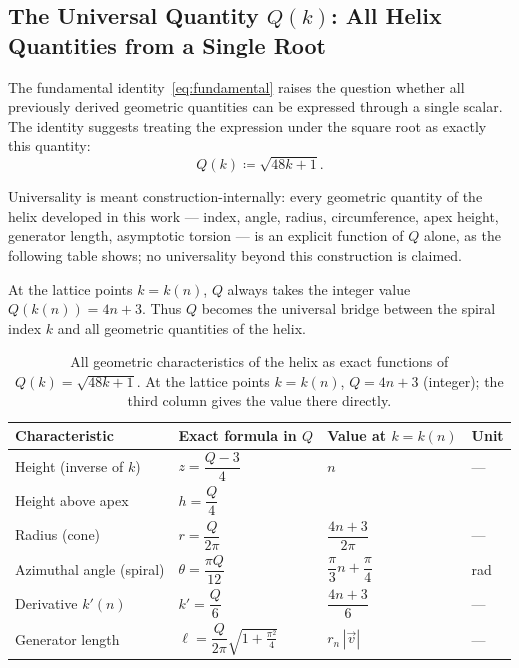 \subsection{The Universal Quantity \texorpdfstring{$Q(k)$}{Q(k)}: All Helix Quantities from a Single Root}
\label{subsec:Q}

The fundamental identity~\eqref{eq:fundamental} raises the question whether all previously derived geometric quantities can be expressed through a single scalar. The identity suggests treating the expression under the square root as exactly this quantity:
\begin{equation}\label{eq:Q_def}
  Q(k) \coloneqq \sqrt{48k + 1}.
\end{equation}

Universality is meant construction-internally: every geometric quantity
of the helix developed in this work --- index, angle, radius,
circumference, apex height, generator length, asymptotic torsion --- is
an explicit function of $Q$ alone, as the following table shows; no
universality beyond this construction is claimed.

At the lattice points $k = k(n)$, $Q$ always takes the integer
value $Q(k(n)) = 4n+3$. Thus $Q$ becomes the universal
bridge between the spiral index $k$ and all geometric quantities of the helix.

\begin{table}[H]
\centering
\renewcommand{\arraystretch}{1.45}
\caption{All geometric characteristics of the helix as exact functions
  of $Q(k) = \sqrt{48k+1}$. At the lattice points $k = k(n)$,
  $Q = 4n+3$ (integer); the third column gives the
  value there directly.}
\begin{tabular}{llll}
\toprule
Characteristic & Exact formula in $Q$ & Value at $k=k(n)$ & Unit \\
\midrule
Height (inverse of $k$)    & $z = \dfrac{Q-3}{4}$
    & $n$
    & --- \\[8pt]
Height above apex          & $h = \dfrac{Q}{4}$\\[8pt]
Radius (cone)              & $r = \dfrac{Q}{2\pi}$
    & $\dfrac{4n+3}{2\pi}$
    & --- \\[8pt]
Azimuthal angle (spiral)   & $\theta = \dfrac{\pi Q}{12}$
    & $\dfrac{\pi}{3}n+\dfrac{\pi}{4}$
    & rad \\[8pt]
Derivative $k'(n)$         & $k' = \dfrac{Q}{6}$
    & $\dfrac{4n+3}{6}$
    & --- \\[8pt]
Generator length           & $\ell = \dfrac{Q}{2\pi}\sqrt{1+\tfrac{\pi^2}{4}}$
    & $r_n\,|\vec{v}|$
    & --- \\[8pt]
\bottomrule
\end{tabular}
\label{tab:Q_uebersicht}
\end{table}

